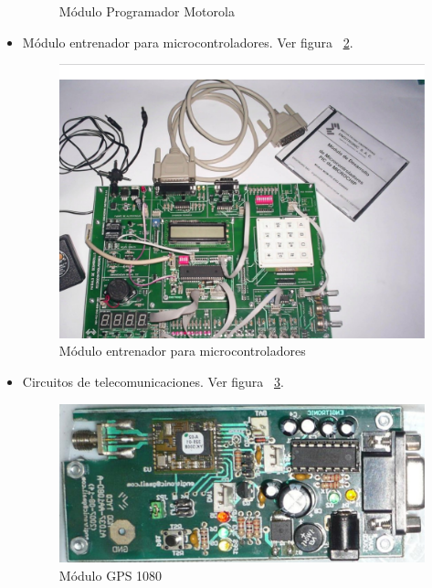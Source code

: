 \begin{itemize}
\begin{figure}[h!]
      \caption{Módulo Programador Motorola}
      \label{fig:modulo-programador-motorola}
    \end{figure}
  \item Módulo entrenador para microcontroladores. Ver figura ~\ref{fig:entrenador-pic}.
    \begin{figure}[h!]
      \centering
      \includegraphics[scale=0.2]{images/company/entrenador-pic.png}
      \caption{Módulo entrenador para microcontroladores}
      \label{fig:entrenador-pic}
    \end{figure}
  \item Circuitos de telecomunicaciones. Ver figura ~\ref{fig:modulo-gps}. 
    \begin{figure}[h!]
      \centering
      \includegraphics[scale=0.2]{images/company/modulo-gps.png}
      \caption{Módulo GPS 1080}
      \label{fig:modulo-gps}
    \end{figure}
\end{itemize}

